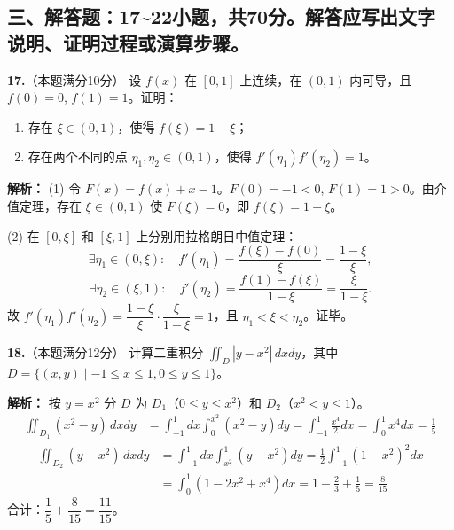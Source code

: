 \newpage

\subsection*{三、解答题：17\textasciitilde22小题，共70分。解答应写出文字说明、证明过程或演算步骤。}

\textbf{17.}（本题满分10分）
设 $f(x)$ 在 $[0,1]$ 上连续，在 $(0,1)$ 内可导，且 $f(0)=0$, $f(1)=1$。证明：
\begin{enumerate}
    \item[(1)] 存在 $\xi \in (0,1)$，使得 $f(\xi) = 1 - \xi$；
    \item[(2)] 存在两个不同的点 $\eta_1,\eta_2 \in (0,1)$，使得 $f'(\eta_1)f'(\eta_2)=1$。
\end{enumerate}

\ifshowsolutions\par\noindent\textbf{解析：}
(1) 令 $F(x)=f(x)+x-1$。$F(0)=-1<0$, $F(1)=1>0$。由介值定理，存在 $\xi\in(0,1)$ 使 $F(\xi)=0$，即 $f(\xi)=1-\xi$。

(2) 在 $[0,\xi]$ 和 $[\xi,1]$ 上分别用拉格朗日中值定理：
\[
\exists\eta_1\in(0,\xi):\quad
f'(\eta_1)=\frac{f(\xi)-f(0)}{\xi}=\frac{1-\xi}{\xi},
\]
\[
\exists\eta_2\in(\xi,1):\quad
f'(\eta_2)=\frac{f(1)-f(\xi)}{1-\xi}=\frac{\xi}{1-\xi}.
\]
故 $f'(\eta_1)f'(\eta_2)=\dfrac{1-\xi}{\xi}\cdot\dfrac{\xi}{1-\xi}=1$，且 $\eta_1<\xi<\eta_2$。证毕。\else \answerarea[8] \fi

\vspace{8pt}

\textbf{18.}（本题满分12分）
计算二重积分 $\displaystyle\iint_{D} |y-x^2|\,dxdy$，其中 $D=\{(x,y)\mid -1\leqslant x\leqslant1, 0\leqslant y\leqslant1\}$。

\ifshowsolutions\par\noindent\textbf{解析：} 按 $y=x^2$ 分 $D$ 为 $D_1$（$0\leqslant y\leqslant x^2$）和 $D_2$（$x^2<y\leqslant1$）。
\begin{align*}
\iint_{D_1}(x^2-y)\,dxdy &= \int_{-1}^{1}dx\int_{0}^{x^2}(x^2-y)dy = \int_{-1}^{1}\frac{x^4}{2}dx = \int_{0}^{1}x^4dx = \frac{1}{5}
\end{align*}
\begin{align*}
\iint_{D_2}(y-x^2)\,dxdy &= \int_{-1}^{1}dx\int_{x^2}^{1}(y-x^2)dy = \frac{1}{2}\int_{-1}^{1}(1-x^2)^2dx \\
&= \int_{0}^{1}(1-2x^2+x^4)dx = 1-\frac{2}{3}+\frac{1}{5} = \frac{8}{15}
\end{align*}
合计：$\dfrac{1}{5}+\dfrac{8}{15}=\dfrac{11}{15}$。\else \answerarea[8] \fi

